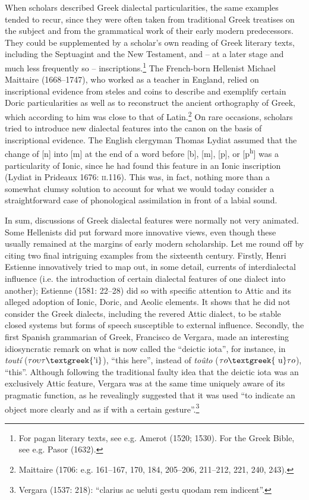 \documentclass[12pt]{article}
\newenvironment{styleStandard}{\renewcommand\baselinestretch{1.25}\setlength\leftskip{0in}\setlength\rightskip{0in}\setlength\parindent{0.1972in}\setlength\parfillskip{0pt plus 1fil}\setlength\parskip{0in plus 1pt}\writerlistparindent\writerlistleftskip\leavevmode\normalfont\normalsize\writerlistlabel\ignorespaces}{\unskip\vspace{0in plus 1pt}\par}
\newcommand\writerlistleftskip{}
\newcommand\writerlistparindent{}
\newcommand\writerlistlabel{}
\begin{document}
\begin{styleStandard}
When scholars described Greek dialectal particularities, the same examples tended to recur, since they were often taken from traditional Greek treatises on the subject and from the grammatical work of their early modern predecessors. They could be supplemented by a scholar’s own reading of Greek literary texts, including the Septuagint and the New Testament, and – at a later stage and much less frequently so – inscriptions.\footnote{ For pagan literary texts, see e.g. Amerot (1520; 1530). For the Greek Bible, see e.g. Pasor (1632).} The French-born Hellenist Michael Maittaire (1668–1747), who worked as a teacher in England, relied on inscriptional evidence from steles and coins to describe and exemplify certain Doric particularities as well as to reconstruct the ancient orthography of Greek, which according to him was close to that of Latin.\footnote{ Maittaire (1706: e.g. 161–167, 170, 184, 205–206, 211–212, 221, 240, 243).} On rare occasions, scholars tried to introduce new dialectal features into the canon on the basis of inscriptional evidence. The English clergyman Thomas Lydiat assumed that the change of [n] into [m] at the end of a word before [b], [m], [p], or [p\textsuperscript{h}] was a particularity of Ionic, since he had found this feature in an Ionic inscription (Lydiat in Prideaux 1676: \textsc{ii}.116). This was, in fact, nothing more than a somewhat clumsy solution to account for what we would today consider a straightforward case of phonological assimilation in front of a labial sound.
\end{styleStandard}

\begin{styleStandard}
In sum, discussions of Greek dialectal features were normally not very animated. Some Hellenists did put forward more innovative views, even though these usually remained at the margins of early modern scholarship. Let me round off by citing two final intriguing examples from the sixteenth century. Firstly, Henri Estienne innovatively tried to map out, in some detail, currents of interdialectal influence (i.e. the introduction of certain dialectal features of one dialect into another); Estienne (1581: 22–28) did so with specific attention to Attic and its alleged adoption of Ionic, Doric, and Aeolic elements. It shows that he did not consider the Greek dialects, including the revered Attic dialect, to be stable closed systems but forms of speech susceptible to external influence. Secondly, the first Spanish grammarian of Greek, Francisco de Vergara, made an interesting idiosyncratic remark on what is now called the “deictic iota”, for instance, in \textit{toutí }($\tau o\upsilon \tau \text{\textgreek{'i}}$), “this here”, instead of \textit{toûto} ($\tau o\text{\textgreek{~u}}\tau o$), “this”. Although following the traditional faulty idea that the deictic iota was an exclusively Attic feature, Vergara was at the same time uniquely aware of its pragmatic function, as he revealingly suggested that it was used “to indicate an object more clearly and as if with a certain gesture”.\footnote{ Vergara (1537: 218): “clarius ac ueluti gestu quodam rem indicent”.}
\end{styleStandard}
\end{document}
